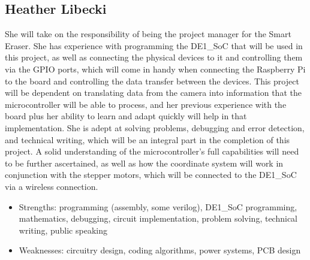 \subsection{Heather Libecki}
She will take on the responsibility of being the project manager for the Smart Eraser. She has experience with programming the DE1\_SoC that will be used in this project, as well as connecting the physical devices to it and controlling them via the GPIO ports, which will come in handy when connecting the Raspberry Pi to the board and controlling the data transfer between the devices. This project will be dependent on translating data from the camera into information that the microcontroller will be able to process, and her previous experience with the board plus her ability to learn and adapt quickly will help in that implementation. She is adept at solving problems, debugging and error detection, and technical writing, which will be an integral part in the completion of this project. A solid understanding of the microcontroller\rq s full capabilities will need to be further ascertained, as well as how the coordinate system will work in conjunction with the stepper motors, which will be connected to the DE1\_SoC via a wireless connection.
\begin{itemize}
	\item Strengths: programming (assembly, some verilog), DE1\_SoC programming, mathematics, debugging, circuit implementation, problem solving, technical writing, public speaking
	\item Weaknesses: circuitry design, coding algorithms, power systems, PCB design 
\end{itemize} 
